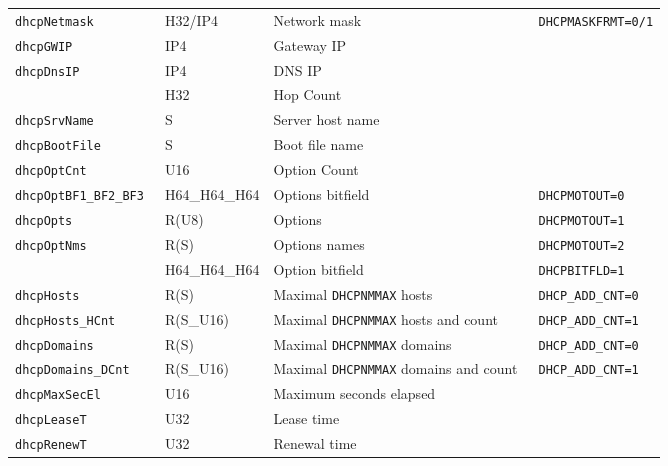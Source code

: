 \documentclass[documentation]{subfiles}
\begin{document}
\begin{longtable}{>{\tt}lll>{\tt\small}l}
    dhcpNetmask                       & H32/IP4       & Network mask                              & DHCPMASKFRMT=0/1\\
    dhcpGWIP                          & IP4           & Gateway IP                                & \\
    dhcpDnsIP                         & IP4           & DNS IP                                    & \\
    \nameref{dhcpHopCnt}              & H32           & Hop Count                                 & \\
    dhcpSrvName                       & S             & Server host name                          & \\
    dhcpBootFile                      & S             & Boot file name                            & \\
    dhcpOptCnt                        & U16           & Option Count                              & \\
    dhcpOptBF1\_BF2\_BF3              & H64\_H64\_H64 & Options bitfield                          & DHCPMOTOUT=0\\
    dhcpOpts                          & R(U8)         & Options                                   & DHCPMOTOUT=1\\
    dhcpOptNms                        & R(S)          & Options names                             & DHCPMOTOUT=2\\
    \nameref{dhcpOptBF}               & H64\_H64\_H64 & Option bitfield                           & DHCPBITFLD=1\\
    dhcpHosts                         & R(S)          & Maximal {\tt DHCPNMMAX} hosts             & DHCP\_ADD\_CNT=0\\
    dhcpHosts\_HCnt                   & R(S\_U16)     & Maximal {\tt DHCPNMMAX} hosts and count   & DHCP\_ADD\_CNT=1\\
    dhcpDomains                       & R(S)          & Maximal {\tt DHCPNMMAX} domains           & DHCP\_ADD\_CNT=0\\
    dhcpDomains\_DCnt                 & R(S\_U16)     & Maximal {\tt DHCPNMMAX} domains and count & DHCP\_ADD\_CNT=1\\
    dhcpMaxSecEl                      & U16           & Maximum seconds elapsed                   & \\
    dhcpLeaseT                        & U32           & Lease time                                & \\
    dhcpRenewT                        & U32           & Renewal time                              & \\

\end{longtable}
\end{document}
